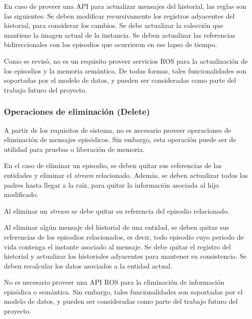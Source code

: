 En caso de proveer una API para actualizar mensajes del historial, las reglas son las siguientes: Se deben modificar recursivamente los registros adyacentes del historial, para considerar los cambios. Se debe actualizar la colección que mantiene la imagen actual de la instancia. Se deben actualizar las referencias bidireccionales con los episodios que ocurrieron en ese lapso de tiempo.

Como se revisó, no es un requisito proveer servicios ROS para la actualización de los episodios y la memoria semántica. De todas formas, tales funcionalidades son soportadas por el modelo de datos, y pueden ser consideradas como parte del trabajo futuro del proyecto.


\subsubsection{Operaciones de eliminación (Delete)}

A partir de los requisitos de sistema, no es necesario proveer operaciones de eliminación de mensajes episódicos. Sin embargo, esta operación puede ser de utilidad para pruebas o liberación de memoria.

 En el caso de eliminar un episodio, se deben quitar sus referencias de las entidades y eliminar el \textit{stream} relacionado. Además, se deben actualizar todos los padres hasta llegar a la raíz, para quitar la información asociada al hijo modificado.

Al eliminar un \textit{stream} se debe quitar su referencia del episodio relacionado.

Al eliminar algún mensaje del historial de una entidad, se deben quitar sus referencias de los episodios relacionados, es decir, todo episodio cuyo periodo de vida contenga el instante asociado al mensaje. Se debe quitar el registro del historial y actualizar los historiales adyacentes para mantener su consistencia. Se deben recalcular los datos asociados a la entidad actual.

No es necesario proveer una API ROS para la eliminación de información episódica o semántica. Sin embargo, tales funcionalidades son soportadas por el modelo de datos, y pueden ser consideradas como parte del trabajo futuro del proyecto.


